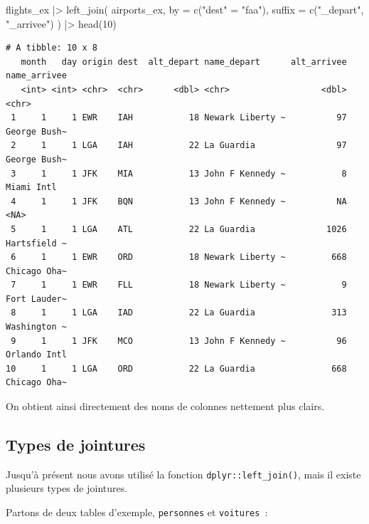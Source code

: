 \documentclass[
  letterpaper,
  DIV=11,
  numbers=noendperiod,
  oneside]{scrreprt}
\newenvironment{Shaded}{\begin{snugshade}}{\end{snugshade}}
\newcommand{\AttributeTok}[1]{\textcolor[rgb]{0.40,0.45,0.13}{#1}}
\newcommand{\DecValTok}[1]{\textcolor[rgb]{0.68,0.00,0.00}{#1}}
\newcommand{\FunctionTok}[1]{\textcolor[rgb]{0.28,0.35,0.67}{#1}}
\newcommand{\NormalTok}[1]{\textcolor[rgb]{0.00,0.23,0.31}{#1}}
\newcommand{\OtherTok}[1]{\textcolor[rgb]{0.00,0.23,0.31}{#1}}
\newcommand{\SpecialCharTok}[1]{\textcolor[rgb]{0.37,0.37,0.37}{#1}}
\newcommand{\StringTok}[1]{\textcolor[rgb]{0.13,0.47,0.30}{#1}}
\begin{document}
\begin{Shaded}
\begin{Highlighting}[]
\NormalTok{flights\_ex }\SpecialCharTok{|\textgreater{}} 
  \FunctionTok{left\_join}\NormalTok{(}
\NormalTok{    airports\_ex, }
    \AttributeTok{by =} \FunctionTok{c}\NormalTok{(}\StringTok{"dest"} \OtherTok{=} \StringTok{"faa"}\NormalTok{), }
    \AttributeTok{suffix =} \FunctionTok{c}\NormalTok{(}\StringTok{"\_depart"}\NormalTok{, }\StringTok{"\_arrivee"}\NormalTok{)}
\NormalTok{  ) }\SpecialCharTok{|\textgreater{}} 
  \FunctionTok{head}\NormalTok{(}\DecValTok{10}\NormalTok{)}
\end{Highlighting}
\end{Shaded}

\begin{verbatim}
# A tibble: 10 x 8
   month   day origin dest  alt_depart name_depart      alt_arrivee name_arrivee
   <int> <int> <chr>  <chr>      <dbl> <chr>                  <dbl> <chr>       
 1     1     1 EWR    IAH           18 Newark Liberty ~          97 George Bush~
 2     1     1 LGA    IAH           22 La Guardia                97 George Bush~
 3     1     1 JFK    MIA           13 John F Kennedy ~           8 Miami Intl  
 4     1     1 JFK    BQN           13 John F Kennedy ~          NA <NA>        
 5     1     1 LGA    ATL           22 La Guardia              1026 Hartsfield ~
 6     1     1 EWR    ORD           18 Newark Liberty ~         668 Chicago Oha~
 7     1     1 EWR    FLL           18 Newark Liberty ~           9 Fort Lauder~
 8     1     1 LGA    IAD           22 La Guardia               313 Washington ~
 9     1     1 JFK    MCO           13 John F Kennedy ~          96 Orlando Intl
10     1     1 LGA    ORD           22 La Guardia               668 Chicago Oha~
\end{verbatim}

On obtient ainsi directement des noms de colonnes nettement plus clairs.

\hypertarget{types-de-jointures}{%
\subsection{Types de jointures}\label{types-de-jointures}}

Jusqu'à présent nous avons utilisé la fonction
\texttt{dplyr::left\_join()}, mais il existe plusieurs types de
jointures.

Partons de deux tables d'exemple, \texttt{personnes} et
\texttt{voitures}~:
\end{document}
